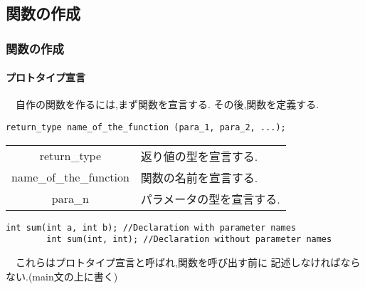 \documentclass[dvipdfmx]{beamer}
\begin{document}

\subsection{関数の作成}
\begin{frame}[t, fragile, label=45]
    \frametitle{関数の作成}
    \framesubtitle{プロトタイプ宣言}
    　自作の関数を作るには,まず関数を宣言する.
    その後,関数を定義する.
    \begin{lstlisting}[gobble=8, 
        caption=Syntax\space of\space function\space declaration]
        return_type name_of_the_function (para_1, para_2, ...);
    \end{lstlisting}
    \begin{table}
    \centering
        \begin{tabular}{cl}
            \hline
            return\_type & 返り値の型を宣言する.\\
            name\_of\_the\_function & 関数の名前を宣言する.\\
            para\_n & パラメータの型を宣言する.\\
            \hline
        \end{tabular}
    \end{table}
    \begin{lstlisting}[gobble=8, 
        caption=Example\space of \space function\space declaration]
        int sum(int a, int b); //Declaration with parameter names
        int sum(int, int); //Declaration without parameter names
    \end{lstlisting}
    　これらはプロトタイプ宣言と呼ばれ,関数を呼び出す前に
    記述しなければならない.(main文の上に書く)
    \vfill \hfill 
    \hyperlink{44}{}
    \space
    \hyperlink{46}{}
\end{frame}
\end{document}

